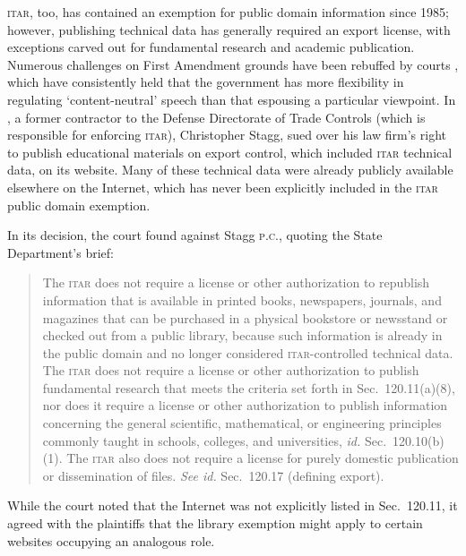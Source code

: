 \documentclass[preprint,twocolumn,5p]{elsarticle}
\begin{document}
\textsc{itar}, too, has contained an exemption for public domain information since 1985; however, publishing technical data has generally required an export license, with exceptions carved out for fundamental research and academic publication. Numerous challenges on First Amendment grounds have been rebuffed by courts \citep{Edler1978,Posey1989,Mak2012,StaggPC2019}, which have consistently held that the government has more flexibility in regulating `content-neutral' speech than that espousing a particular viewpoint. In , a former contractor to the Defense Directorate of Trade Controls (which is responsible for enforcing \textsc{itar}), Christopher Stagg, sued over his law firm's right to publish educational materials on export control, which included \textsc{itar} technical data, on its website. Many of these technical data were already publicly available elsewhere on the Internet, which has never been explicitly included in the \textsc{itar} public domain exemption.

In its decision, the court found against Stagg \textsc{p.c.}, quoting the State Department's brief:
\begin{quote}
The \textsc{itar} does not require a license or other authorization to republish information that is available in printed books, newspapers, journals, and magazines that can be purchased in a physical bookstore or newsstand or checked out from a public library, because such information is already in the public domain and no longer considered \textsc{itar}-controlled technical data. The \textsc{itar} does not require a license or other authorization to publish fundamental research that meets the criteria set forth in Sec.~120.11(a)(8), nor does it require a license or other authorization to publish information concerning the general scientific, mathematical, or engineering principles commonly taught in schools, colleges, and universities, \textit{id.} Sec.~120.10(b)(1). The \textsc{itar} also does not require a license for purely domestic publication or dissemination of files. \textit{See id.} Sec.~120.17 (defining export). \citep{StaggPC2019}
\end{quote}
While the court noted that the Internet was not explicitly listed in Sec.~120.11, it agreed with the plaintiffs that the library exemption might apply to certain websites occupying an analogous role.
\end{document}
